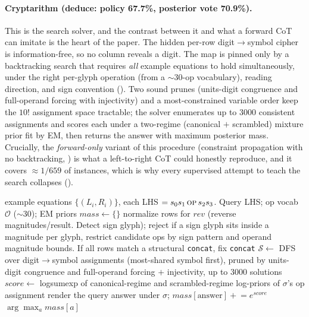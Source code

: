 \documentclass[11pt]{article}
\begin{document}
\paragraph{Cryptarithm (deduce: policy 67.7\%, posterior vote 70.9\%).} This is the search
solver, and the contrast between it and what a forward CoT can imitate is the heart of the
paper. The hidden per-row digit$\to$symbol cipher is information-free, so no column reveals a
digit. The map is pinned only by a backtracking search that requires \emph{all} example
equations to hold simultaneously, under the right per-glyph operation (from a $\sim$30-op
vocabulary), reading direction, and sign convention (). Two sound prunes
(units-digit congruence and full-operand forcing with injectivity) and a most-constrained
variable order keep the $10!$ assignment space tractable; the solver enumerates up to
$3000$ consistent assignments and scores each under a two-regime (canonical $+$ scrambled)
mixture prior fit by EM, then returns the answer with maximum posterior mass. Crucially, the
\emph{forward-only} variant of this procedure (constraint propagation with no backtracking,
) is what a left-to-right CoT could honestly reproduce, and it covers
$\approx\!1/659$ of instances, which is why every supervised attempt to teach the search
collapses ().

\begin{algorithm}[htbp]
\caption{\textsc{Cryptarithm}, search solver \texttt{cryptarithm2} (deduce vote 70.9\%)}
\label{alg:crypt}
\begin{algorithmic}[1]
\Require example equations $\{(L_i,R_i)\}$, each LHS $=s_0 s_1\,\textsc{op}\,s_2 s_3$. Query LHS; op vocab $\mathcal{O}$ ($\sim$30); EM priors
\State $\mathit{mass}\gets\{\}$
 
  \State normalize rows for $\mathit{rev}$ (reverse magnitudes/result. Detect sign glyph); reject if a sign glyph sits inside a magnitude
  \State per glyph, restrict candidate ops by sign pattern and operand magnitude bounds. If all rows match a structural \texttt{concat}, fix \texttt{concat}
  \State $\mathcal{S}\gets$ DFS over digit$\to$symbol assignments (most-shared symbol first), pruned by units-digit congruence and full-operand forcing $+$ injectivity, up to $3000$ solutions
    \State $\mathit{score}\gets$ logsumexp of canonical-regime and scrambled-regime log-priors of $\sigma$'s op assignment
    \State render the query answer under $\sigma$; $\mathit{mass}[\text{answer}]\mathrel{+}=e^{\mathit{score}}$
  \EndFor
\EndFor
\State \Return $\arg\max_{a}\mathit{mass}[a]$ 
\end{algorithmic}
\end{algorithm}
\end{document}
